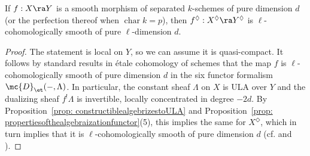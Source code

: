 \documentclass[letterpaper,11pt]{amsart}
\begin{document}

\begin{corollary}{\label{prop: Compatabilitieswithupper!s}}
If $f: X \ra Y$ is a smooth morphism of separated $k$-schemes of pure dimension $d$ (or the perfection thereof when $\operatorname{char}k=p$), then $f^{\Diamond}: X^{\Diamond} \ra Y^{\Diamond}$ is $\ell$-cohomologically smooth of pure $\ell$-dimension $d$.  
\end{corollary}
\begin{proof}
The statement is local on $Y$, so we can assume it is quasi-compact. It follows by standard results in \'etale cohomology of schemes that the map $f$ is $\ell$-cohomologically smooth of pure dimension $d$ in the six functor formalism $\mc{D}_\et(-,\Lambda)$. In particular, the constant sheaf $\Lambda$ on $X$ is ULA over $Y$ and the dualizing sheaf $f^!\Lambda$ is invertible, locally concentrated in degree $-2d$. By Proposition~\ref{prop: constructiblealgebrizestoULA} and Proposition~\ref{prop: propertiesofthealgebraizationfunctor}(5), this implies the same for $X^{\Diamond}$, which in turn implies that it is $\ell$-cohomologically smooth of pure dimension $d$ (cf. \cite[Proposition~ IV.2.33]{FSGeomLLC} and \cite[Theorem~3.3.12 (7)]{GHILZIsocComparison}).
\end{proof}
\end{document}
